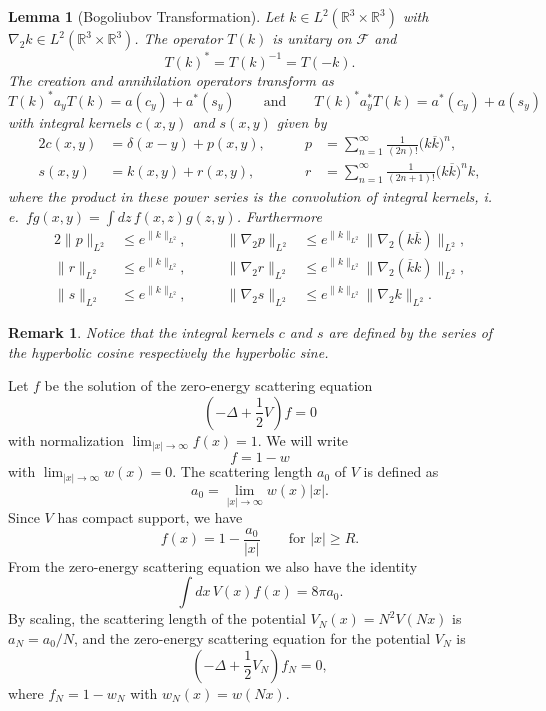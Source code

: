 \documentclass[11pt,a4paper,draft,DIV11]{scrartcl}	%
\newtheorem{lem}[thm]{Lemma}
\newtheorem*{rem}{Remark}
\newcommand{\R}{\mathds{R}}
\newcommand{\be}[1]{\begin{equation}\label{eq:#1}}	%
\newcommand{\ee}{\end{equation}}
\begin{document}
\begin{lem}[Bogoliubov Transformation] \label{l:bt}
  Let $k \in L^2(\R^3 \times \R^3)$ with $\nabla_2 k \in L^2(\R^3 \times
  \R^3)$. The operator $T(k)$ is unitary on $\mathcal{F}$ and
  \[
    T(k)^* = T(k)^{-1} = T(-k).
  \]
  The creation and annihilation operators transform as
  \be{no4}
    T(k)^* a_y T(k) = a(c_y) + a^*(s_y) \qquad \text{and} \qquad T(k)^*
    a_y^* T(k) = a^*(c_y) + a(s_y)
  \ee
  with integral kernels $c(x,y)$ and $s(x,y)$ given by
  \begin{alignat*}{2}
    c(x,y) & = \delta(x-y) + p(x,y), & \qquad p & = \sum_{n=1}^\infty \frac{1}{(2n)!}
    \big( k \overline{k} \big)^n, \\
    s(x,y) & = k(x,y) + r(x,y), & \qquad r & = \sum_{n=1}^\infty \frac{1}{(2n+1)!}
    \big( k \overline{k} \big)^n k,
  \end{alignat*}
  where the product in these
  power series is the convolution of integral kernels, i.\,e.\ $fg(x,y) =
  \int dz \, f(x,z) g(z,y)$. Furthermore
  \begin{alignat*}{2}
    \| p \|_{L^2} & \le e^{\| k \|_{L^2}}, \qquad & \| \nabla_2 p
    \|_{L^2} & \le e^{\| k \|_{L^2}} \| \nabla_2 (k
    \overline{k}) \|_{L^2}, \\
    \| r \|_{L^2} & \le e^{\| k \|_{L^2}}, \qquad & \| \nabla_2 r
    \|_{L^2} & \le e^{\| k \|_{L^2}} \| \nabla_2 (\overline{k} k)
    \|_{L^2}, \\
    \| s \|_{L^2} & \le e^{\| k \|_{L^2}}, \qquad & \| \nabla_2 s
    \|_{L^2} & \le e^{\| k \|_{L^2}} \| \nabla_2 k \|_{L^2}.
  \end{alignat*}
\end{lem}
\begin{rem}
Notice that the integral kernels $c$ and $s$ are defined by the series of the hyperbolic cosine respectively the hyperbolic sine. 
\end{rem}


Let $f$ be the solution of the zero-energy scattering equation
\[
  \left( -\Delta + \frac{1}{2} V \right) f = 0
\]
with normalization $\lim_{|x|\to\infty} f(x) = 1$. We will write
\[
  f = 1 - w
\]
with $\lim_{|x|\to\infty} w(x) = 0$. The scattering length $a_0$ of $V$ is
defined as
\[
  a_0 = \lim_{|x| \to \infty} w(x)|x|.
\]
Since $V$ has compact support, we have
\[
  f(x) = 1 - \frac{a_0}{|x|} \qquad \text{for } |x| \ge R.
\]
From the zero-energy scattering equation we also have the identity
\[
  \int dx \, V(x) f(x) = 8 \pi a_0.
\]
By scaling, the scattering length of the potential $V_N(x) = N^2 V(Nx)$ is
$a_N = a_0/N$, and the zero-energy scattering equation for the potential $V_N$
is
\begin{equation} \label{eq:scattering}
  \left( -\Delta + \frac{1}{2} V_N \right) f_N = 0,
\end{equation}
where $f_N = 1 - w_N$ with $w_N(x) = w(Nx)$.
\end{document}
